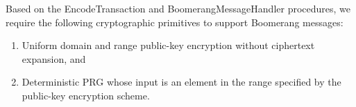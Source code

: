
Based on the {\sf EncodeTransaction} and {\sf BoomerangMessageHandler} procedures, we require the following cryptographic primitives to support Boomerang messages:
\begin{enumerate}
	\item Uniform domain and range public-key encryption without ciphertext expansion, and
	\item Deterministic PRG whose input is an element in the range specified by the public-key encryption scheme.
\end{enumerate}



